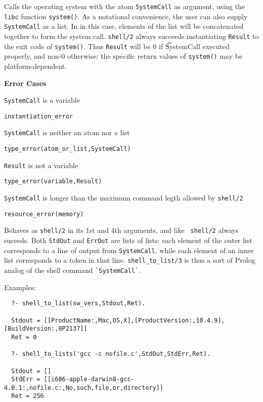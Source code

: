 \begin{description}
%
Calls the operating system with the atom {\tt SystemCall} as argument,
using the {\tt libc} function {\tt system()}.  As a notational
convenience, the user can also supply {\tt SystemCall} as a list.  In
in this case, elements of the list will be concatenated together to
form the system call.  {\tt shell/2} always succeeds instantiating
{\tt Result} to the exit code of {\tt system()}.  Thus {\tt Result}
will be 0 if {\t SystemCall} executed properly, and non-0 otherwise:
the specific return values of {\tt system()} may be platform-dependent.

{\bf Error Cases}
\bi
\item  {\tt SystemCall} is a variable
\bi
\item {\tt instantiation\_error}
\ei
\item {\tt SystemCall} is neither an atom nor a list
\bi
\item {\tt type\_error(atom\_or\_list,SystemCall)}
\ei
\item {\tt Result} is not a variable
\bi
\item {\tt type\_error(variable,Result)}
\ei
\item {\tt SystemCall} is longer than the maximum command legth
  allowed by {\tt shell/2}
\bi
\item {\tt resource\_error(memory)}
\ei
\ei


%
Behaves as {\tt shell/2} in its 1st and 4th arguments, and like {\tt
  shell/2} always suceeds.  Both {\tt StdOut} and {\tt ErrOut} are
lists of lists: each element of the outer list corresponds to a line
of output from {\tt SystemCall}, while each element of an inner list
corresponds to a token in that line.  {\tt shell\_to\_list/3} is thus
a sort of Prolog analog of the shell command \verb|`SystemCall`|.

Examples:
\begin{verbatim}
  ?- shell_to_list(sw_vers,Stdout,Ret).

  Stdout = [[ProductName:,Mac,OS,X],[ProductVersion:,10.4.9],[BuildVersion:,8P2137]]
  Ret = 0

  ?- shell_to_lists('gcc -c nofile.c',StdOut,StdErr,Ret).

  Stdout = []
  StdErr = [[i686-apple-darwin8-gcc-4.0.1:,nofile.c:,No,such,file,or,directory]]
  Ret = 256
\end{verbatim}


\end{description}
